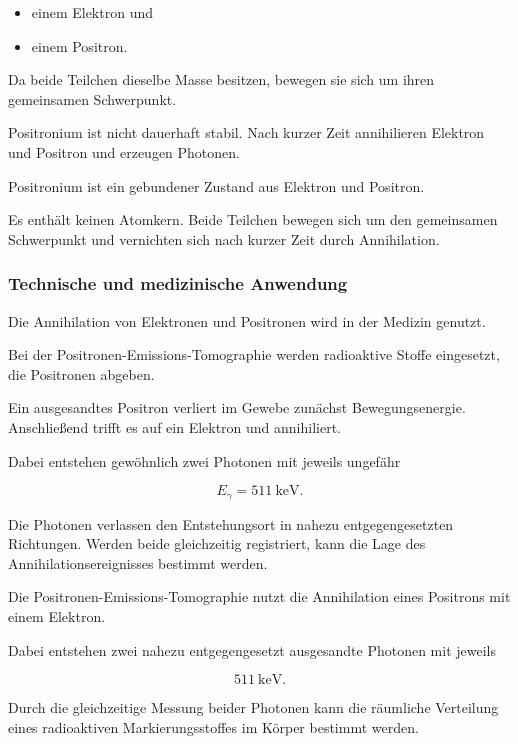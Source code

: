 \begin{itemize}
	\item einem Elektron und
	\item einem Positron.
\end{itemize}

Da beide Teilchen dieselbe Masse besitzen, bewegen sie sich um ihren
gemeinsamen Schwerpunkt.

Positronium ist nicht dauerhaft stabil. Nach kurzer Zeit annihilieren
Elektron und Positron und erzeugen Photonen.

\begin{NoteBox}
	\label{box:positronium_kurzlebiges_atom}
	
	Positronium ist ein gebundener Zustand aus Elektron und Positron.
	
	Es enthält keinen Atomkern. Beide Teilchen bewegen sich um den
	gemeinsamen Schwerpunkt und vernichten sich nach kurzer Zeit durch
	Annihilation.
\end{NoteBox}

\subsubsection*{Technische und medizinische Anwendung}

Die Annihilation von Elektronen und Positronen wird in der Medizin
genutzt.

Bei der Positronen-Emissions-Tomographie%
werden radioaktive Stoffe eingesetzt, die Positronen abgeben.

Ein ausgesandtes Positron verliert im Gewebe zunächst Bewegungsenergie.
Anschließend trifft es auf ein Elektron und annihiliert.

Dabei entstehen gewöhnlich zwei Photonen mit jeweils ungefähr

\begin{equation}
	E_{\gamma}
	=
	\SI{511}{\kilo\electronvolt}.
\end{equation}

Die Photonen verlassen den Entstehungsort in nahezu entgegengesetzten
Richtungen. Werden beide gleichzeitig registriert, kann die Lage des
Annihilationsereignisses bestimmt werden.

\begin{PhysicsBox}
	\label{box:positronen_medizinische_bildgebung}
	
	Die Positronen-Emissions-Tomographie nutzt die Annihilation eines
	Positrons mit einem Elektron.
	
	Dabei entstehen zwei nahezu entgegengesetzt ausgesandte Photonen mit
	jeweils
	
	\begin{equation}
		\SI{511}{\kilo\electronvolt}.
	\end{equation}
	
	Durch die gleichzeitige Messung beider Photonen kann die räumliche
	Verteilung eines radioaktiven Markierungsstoffes im Körper bestimmt
	werden.
\end{PhysicsBox}

